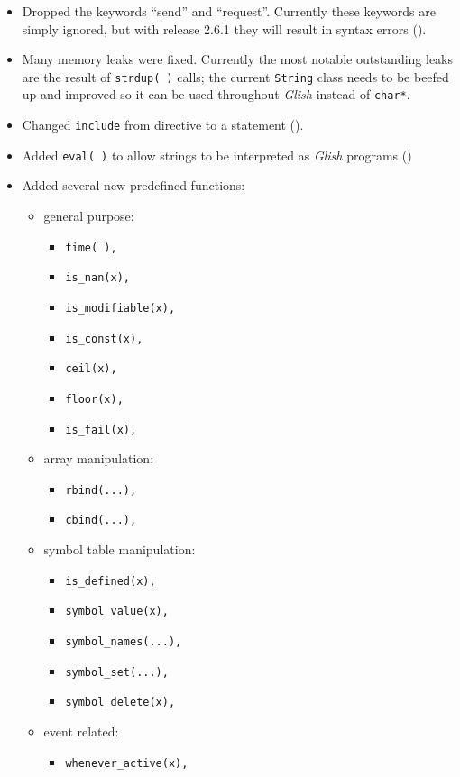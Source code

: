 \begin{itemize}
\item Dropped the keywords ``send'' and ``request''. Currently these
keywords are simply ignored, but with release 2.6.1 they will result in
syntax errors ().

\item Many memory leaks were fixed. Currently the most notable outstanding
leaks are the result of \texttt{strdup( )} calls; the current \texttt{String} class
needs to be beefed up and improved so it can be used throughout \emph{Glish} instead
of \texttt{char*}.

\item Changed \texttt{include} from directive to a statement
().

\item Added \texttt{eval( )} to allow strings to be interpreted as \emph{Glish}
programs ()

\item Added several new predefined functions:
\begin{itemize}
\item general purpose:
\begin{itemize}
\item \tt{time( )}, 
\item \tt{is\_nan(x)}, 
\item \tt{is\_modifiable(x)}, 
\item \tt{is\_const(x)}, 
\item \tt{ceil(x)}, 
\item \tt{floor(x)}, 
\item \tt{is\_fail(x)}, 
\end{itemize}
\item array manipulation:
\begin{itemize}
\item \tt{rbind(...)}, 
\item \tt{cbind(...)}, 
\end{itemize}
\item symbol table manipulation:
\begin{itemize}
\item \tt{is\_defined(x)}, 
\item \tt{symbol\_value(x)}, 
\item \tt{symbol\_names(...)}, 
\item \tt{symbol\_set(...)}, 
\item \tt{symbol\_delete(x)}, 
\end{itemize}
\item event related:
\begin{itemize}
\item \tt{whenever\_active(x)}, 
\end{itemize}
\end{itemize}


\end{itemize}
